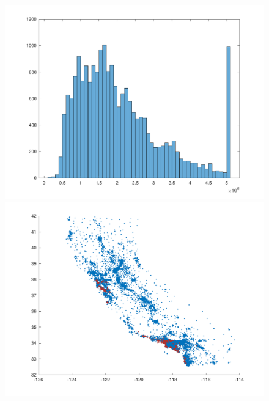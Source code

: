 \begingroup
\begin{figure}
\vspace{-1cm}
\centering
\includegraphics[width=0.9\linewidth]{../src/figures/fssvm/california_hist_1}\hfil
\includegraphics[width=0.9\linewidth]{../src/figures/fssvm/california_pricey}\hfil
{}
\label{calipricey}
\end{figure}


